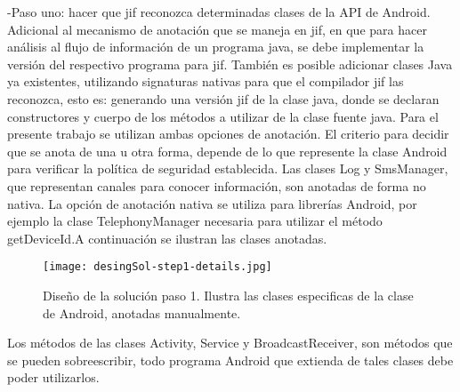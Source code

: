 -Paso uno: hacer que jif reconozca determinadas clases de la API de
Android.\newline 
Adicional al mecanismo de anotación que se maneja en jif, en que para hacer
análisis al flujo de información de un programa java, se debe implementar la
versión del respectivo programa para jif. También es posible adicionar clases
Java ya existentes, utilizando signaturas nativas para que el compilador jif las
reconozca, esto es: generando una versión jif de la clase java, donde se
declaran constructores y cuerpo de los métodos a utilizar de la clase fuente
java.\newline
Para el presente trabajo se utilizan ambas opciones de anotación. El criterio
para decidir que se anota de una u otra forma, depende de lo que represente la
clase Android para verificar la política de seguridad establecida. Las clases
Log y SmsManager, que representan canales para conocer información, son anotadas
de forma no nativa. La opción de anotación nativa se utiliza para librerías
Android, por ejemplo la clase TelephonyManager necesaria para utilizar el método
getDeviceId.\newline A continuación se ilustran las clases anotadas.

\begin{figure}[h!]
	\begin{center}
	\texttt{[image: desingSol-step1-details.jpg]}
	\end{center}
	\caption{Diseño de la solución paso 1. Ilustra las clases especificas de la
	clase de Android, anotadas manualmente.}
	\label{fig:desingSol-step1}
\end{figure}

Los métodos de las clases Activity, Service y BroadcastReceiver, son métodos
que se pueden sobreescribir, todo programa Android que extienda de tales clases
debe poder utilizarlos.

